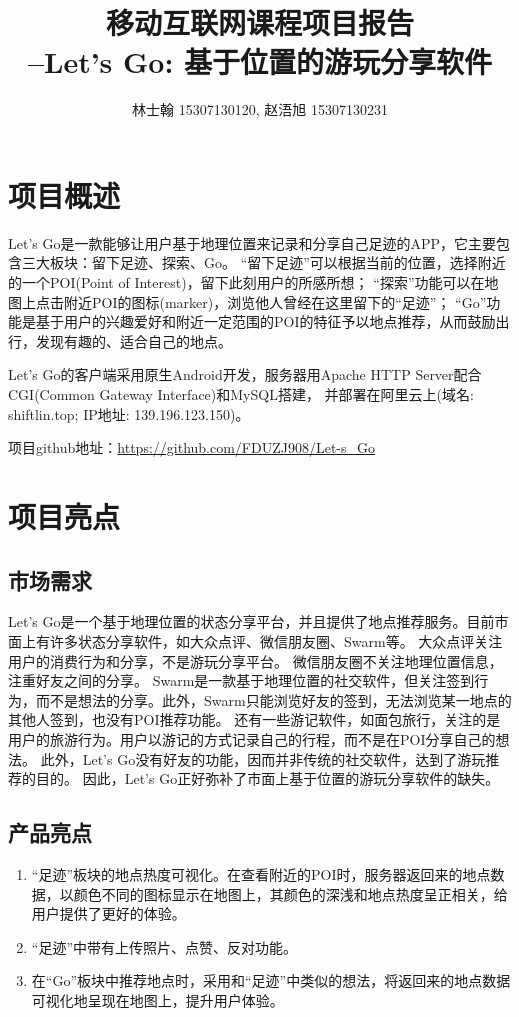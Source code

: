 \documentclass[UTF8]{article}
\begin{document}
\begin{titlepage}
\title{\huge{\bfseries 移动互联网课程项目报告\\--Let's Go: 基于位置的游玩分享软件}}
\author{林士翰 15307130120, 赵浯旭 15307130231}
\date{}
\maketitle
\tableofcontents
\thispagestyle{empty}
\end{titlepage}

\section{项目概述}
Let's Go是一款能够让用户基于地理位置来记录和分享自己足迹的APP，它主要包含三大板块：留下足迹、探索、Go。
“留下足迹”可以根据当前的位置，选择附近的一个POI(Point of Interest)，留下此刻用户的所感所想；
“探索”功能可以在地图上点击附近POI的图标(marker)，浏览他人曾经在这里留下的“足迹”；
“Go”功能是基于用户的兴趣爱好和附近一定范围的POI的特征予以地点推荐，从而鼓励出行，发现有趣的、适合自己的地点。

Let's Go的客户端采用原生Android开发，服务器用Apache HTTP Server配合CGI(Common Gateway Interface)和MySQL搭建，
并部署在阿里云上(域名: shiftlin.top; IP地址: 139.196.123.150)。

项目github地址：\url{https://github.com/FDUZJ908/Let-s_Go}


\section{项目亮点}
\subsection{市场需求}
Let's Go是一个基于地理位置的状态分享平台，并且提供了地点推荐服务。目前市面上有许多状态分享软件，如大众点评、微信朋友圈、Swarm等。
大众点评关注用户的消费行为和分享，不是游玩分享平台。
微信朋友圈不关注地理位置信息，注重好友之间的分享。
Swarm是一款基于地理位置的社交软件，但关注签到行为，而不是想法的分享。此外，Swarm只能浏览好友的签到，无法浏览某一地点的其他人签到，也没有POI推荐功能。
还有一些游记软件，如面包旅行，关注的是用户的旅游行为。用户以游记的方式记录自己的行程，而不是在POI分享自己的想法。
此外，Let's Go没有好友的功能，因而并非传统的社交软件，达到了游玩推荐的目的。
因此，Let's Go正好弥补了市面上基于位置的游玩分享软件的缺失。

\subsection{产品亮点}
\begin{enumerate}
    \item “足迹”板块的地点热度可视化。在查看附近的POI时，服务器返回来的地点数据，以颜色不同的图标显示在地图上，其颜色的深浅和地点热度呈正相关，给用户提供了更好的体验。
    \item “足迹”中带有上传照片、点赞、反对功能。
    \item 在“Go”板块中推荐地点时，采用和“足迹”中类似的想法，将返回来的地点数据可视化地呈现在地图上，提升用户体验。
\end{enumerate}
\end{document}
